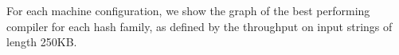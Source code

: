\documentclass[sigconf, nonacm]{acmart}
\begin{document}
For each machine configuration, we show the graph of the best performing compiler for each hash family, as defined by the throughput on input strings of length 250KB.







\end{document}
